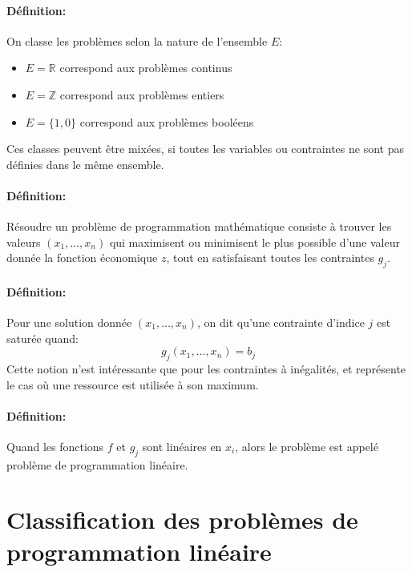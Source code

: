 \documentclass[a4paper]{report}
\begin{document}
\paragraph{Définition:}On classe les problèmes selon la nature de l'ensemble
\(E\):
\begin{itemize}
	\item \(E=\mathbb{R}\) correspond aux problèmes continus
	\item \(E=\mathbb{Z}\) correspond aux problèmes entiers
	\item \(E=\{1,0\}\) correspond aux problèmes booléens
\end{itemize}
Ces classes peuvent être mixées, si toutes les variables ou contraintes ne sont
pas définies dans le même ensemble.

\paragraph{Définition:}
Résoudre un problème de programmation mathématique consiste à trouver les
valeurs \((x_1,\dots,x_n)\) qui maximisent ou minimisent le plus
possible d'une valeur donnée la fonction économique \(z\),
tout en satisfaisant toutes les contraintes \(g_j\).

\paragraph{Définition:}
Pour une solution donnée \((x_1,\dots,x_n)\), on dit qu'une contrainte
d'indice \(j\) est saturée quand:
\[g_j(x_1,\dots,x_n)=b_j\]
Cette notion n'est intéressante que pour les contraintes à inégalités, et
représente le cas où une ressource est utilisée à son maximum.
\paragraph{Définition:}
Quand les fonctions \(f\) et \(g_j\) sont linéaires en \(x_i\), alors le
problème est appelé problème de programmation linéaire.

\section{Classification des problèmes de programmation linéaire}
\end{document}
